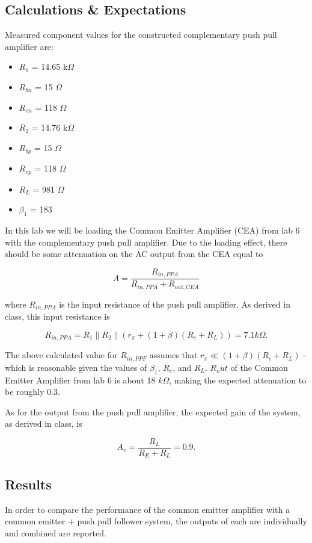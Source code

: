 \documentclass[12pt,letterpaper]{report}
\newcommand{\parallelsum}{\mathbin{\|}}
\begin{document}
\subsection*{Calculations \& Expectations}

Measured component values for the constructed complementary push pull amplifier are:
\begin{itemize}
\item $R_1$ = 14.65 k$\Omega$
\item $R_{bn}$ = 15 $\Omega$
\item $R_{en}$ = 118 $\Omega$

\item $R_2$ = 14.76 k$\Omega$
\item $R_{bp}$ = 15 $\Omega$
\item $R_{ep}$ = 118 $\Omega$

\item $R_L$ = 981 $\Omega$
\item $\beta_{1}$ = 183
\end{itemize}

In this lab we will be loading the Common Emitter Amplifier (CEA) from lab 6 with the complementary push pull amplifier. Due to the loading effect, there should be some attenuation on the AC output from the CEA equal to

$$
A = \frac{R_{in,PPA}}{R_{in,PPA} + R_{out,CEA}}
$$

where $R_{in,PPA}$ is the input resistance of the push pull amplifier. As derived in class, this input resistance is

$$
R_{in,PPA} = R_1 \parallelsum R_2 \parallelsum (r_{\pi} + (1 + \beta)(R_e + R_L)) = 7.1 k\Omega.
$$

The above calculated value for $R_{in,PPF}$ assumes that $r_{\pi} \ll (1 + \beta)(R_e + R_L)$ - which is reasonable given the values of $\beta_1$, $R_e$, and $R_L$. $R_out$ of the Common Emitter Amplifier from lab 6 is about 18 $k\Omega$, making the expected attenuation to be roughly 0.3.

As for the output from the push pull amplifier, the expected gain of the system, as derived in class, is

$$
A_v = \frac{R_L}{R_E  + R_L} = 0.9.
$$


\subsection*{Results}

In order to compare the performance of the common emitter amplifier with a common emitter + push pull follower system, the outputs of each are individually and combined are reported.
\end{document}
